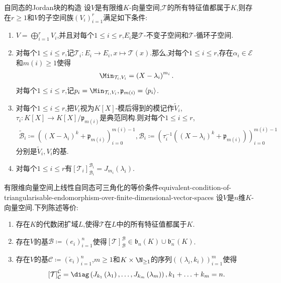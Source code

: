 \begin{proposition}{自同态的Jordan块的构造}{}
	设$V$是有限维$K$-向量空间,$\mathcal{T}$的所有特征值都属于$K$,则存在$r\geq 1$和$V$的子空间族$\left(V_{i}\right)_{i=1}^{r}$满足如下条件:
	\begin{enumerate}
		\item $V=\bigoplus\limits_{i=1}^{r}V_{i}$,并且对每个$1\leq i\leq r$,$E_{i}$是$\mathcal{T}$-不变子空间和$\mathcal{T}$-循环子空间.
		\item 对每个$1\leq i\leq r$,记$\mathcal{T}_{i}:E_{i}\to E_{i},x\mapsto\mathcal{T}\left(x\right)$.那么,对每个$1\leq i\leq r$,存在$\alpha_{i}\in\mathscr{E}$和$m\left(i\right)\geq 1$使得
		\begin{align*}
			\Min_{\mathcal{T}_{i},V_{i}}=\left(X-\lambda_{i}\right)^{m_{i}}.
		\end{align*}
		对每个$1\leq i\leq r$,记$p_{i}=\Min_{\mathcal{T}_{i},V_{i}},\mathfrak{p}_{m\left(i\right)}=\langle p_{i}\rangle$.
		\item 对每个$1\leq i\leq r$,把$V_{i}$视为$K[X]$-模后得到的模记作$\tilde{V}_{i}$,$\tau_{i}:K[X]\to K[X]/\mathfrak{p}_{m\left(i\right)}$是典范同构.则对每个$1\leq i\leq r$,
		\begin{align*}
			\tilde{\mathcal{B}}_{i}\coloneq((X-\lambda_{i})^{k}+\mathfrak{p}_{m\left(i\right)})_{i=0}^{m\left(i\right)-1},
			\mathcal{B}_{i}\coloneq(\tau_{i}^{-1}((X-\lambda_{i})^{k}+\mathfrak{p}_{m\left(i\right)}))_{i=0}^{m\left(i\right)-1}
		\end{align*}
		分别是$\tilde{V}_{i},V_{i}$的基.
		\item 对每个$1\leq i\leq r$有$\left[\mathcal{T}_{i}\right]_{\mathcal{B}_{i}}^{\mathcal{B}_{i}}=J_{m_{i}}\left(\lambda_{i}\right)$.
	\end{enumerate}
\end{proposition}

\begin{proposition}{有限维向量空间上线性自同态可三角化的等价条件}{equivalent-condition-of-triangularisable-endomorphism-over-finite-dimensional-vector-spaces}
	设$V$是$n$维$K$-向量空间.下列陈述等价:
	\begin{enumerate}
		\item 存在$K$的代数闭扩域$L$,使得$\mathcal{T}$在$L$中的所有特征值都属于$K$.
		\item 存在$V$的基$\mathcal{B}\coloneq\left(e_{i}\right)_{i=1}^{n}$使得$\left[\mathcal{T}\right]_{\mathcal{B}}^{\mathcal{B}}\in \mathfrak{b}_{n}\left(K\right)\cup\mathfrak{b}_{n}^{-}\left(K\right)$.
		\item 存在$V$的基$\mathcal{C}\coloneq\left(\check{e}_{i}\right)_{i=1}^{n}$,$m\geq 1$和$K\times\N_{\geq 1}$的序列$\left(\left(\lambda_{i},k_{i}\right)\right)_{i=1}^{m}$使得
		\begin{align*}
			\left[\mathcal{T}\right]_{\mathcal{C}}^{\mathcal{C}}=\diag\left(J_{k_{1}}\left(\lambda_{1}\right),\ldots,J_{k_{m}}\left(\lambda_{m}\right)\right),k_{1}+\ldots+k_{m}=n.
		\end{align*}
	\end{enumerate}
\end{proposition}

